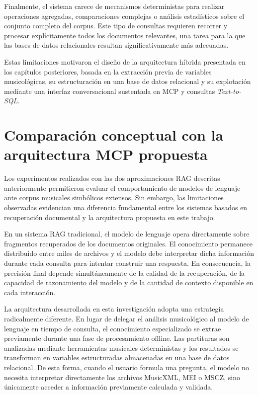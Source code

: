Finalmente, el sistema carece de mecanismos deterministas para realizar operaciones agregadas, comparaciones complejas o análisis estadísticos sobre el conjunto completo del corpus. Este tipo de consultas requieren recorrer y procesar explícitamente todos los documentos relevantes, una tarea para la que las bases de datos relacionales resultan significativamente más adecuadas.

Estas limitaciones motivaron el diseño de la arquitectura híbrida presentada en los capítulos posteriores, basada en la extracción previa de variables musicológicas, su estructuración en una base de datos relacional y su explotación mediante una interfaz conversacional sustentada en MCP y consultas \textit{Text-to-SQL}.

\section{Comparación conceptual con la arquitectura MCP propuesta}
Los experimentos realizados con las dos aproximaciones RAG descritas anteriormente permitieron evaluar el comportamiento de modelos de lenguaje ante corpus musicales simbólicos extensos. Sin embargo, las limitaciones observadas evidencian una diferencia fundamental entre los sistemas basados en recuperación documental y la arquitectura propuesta en este trabajo.

En un sistema RAG tradicional, el modelo de lenguaje opera directamente sobre fragmentos recuperados de los documentos originales. El conocimiento permanece distribuido entre miles de archivos y el modelo debe interpretar dicha información durante cada consulta para intentar construir una respuesta. En consecuencia, la precisión final depende simultáneamente de la calidad de la recuperación, de la capacidad de razonamiento del modelo y de la cantidad de contexto disponible en cada interacción.

La arquitectura desarrollada en esta investigación adopta una estrategia radicalmente diferente. En lugar de delegar el análisis musicológico al modelo de lenguaje en tiempo de consulta, el conocimiento especializado se extrae previamente durante una fase de procesamiento offline. Las partituras son analizadas mediante herramientas musicales deterministas y los resultados se transforman en variables estructuradas almacenadas en una base de datos relacional. De esta forma, cuando el usuario formula una pregunta, el modelo no necesita interpretar directamente los archivos MusicXML, MEI o MSCZ, sino únicamente acceder a información previamente calculada y validada.

